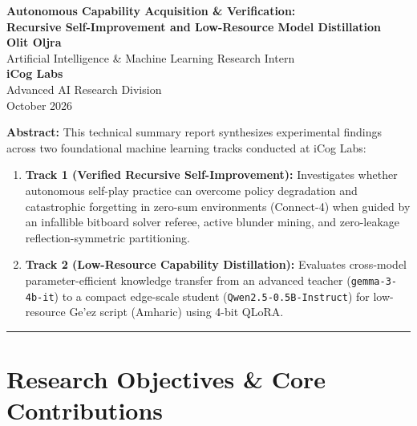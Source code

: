 \documentclass[11pt,a4paper]{article}
\begin{document}
\begin{titlepage}
\begin{center}
    \vspace*{1.5cm}
    {\LARGE\bfseries\color{headcol}
        Autonomous Capability Acquisition \& Verification:\\[6pt]
        Recursive Self-Improvement and Low-Resource Model Distillation
    }\\[1.5cm]
    {\Large\textbf{Olit Oljra}}\\[0.4cm]
    {\large Artificial Intelligence \& Machine Learning Research Intern}\\[0.6cm]
    {\large\textbf{iCog Labs}}\\[0.2cm]
    {\large Advanced AI Research Division}\\[1.2cm]
    {\large October 2026}
    \vfill
    \begin{minipage}{0.85\linewidth}
        \small
        \textbf{Abstract:} This technical summary report synthesizes experimental findings across two foundational machine learning tracks conducted at iCog Labs:
        \begin{enumerate}[leftmargin=1.5em, itemsep=2pt]
            \item \textbf{Track 1 (Verified Recursive Self-Improvement):} Investigates whether autonomous self-play practice can overcome policy degradation and catastrophic forgetting in zero-sum environments (Connect-4) when guided by an infallible bitboard solver referee, active blunder mining, and zero-leakage reflection-symmetric partitioning.
            \item \textbf{Track 2 (Low-Resource Capability Distillation):} Evaluates cross-model parameter-efficient knowledge transfer from an advanced teacher (\texttt{gemma-3-4b-it}) to a compact edge-scale student (\texttt{Qwen2.5-0.5B-Instruct}) for low-resource Ge'ez script (Amharic) using 4-bit QLoRA.
        \end{enumerate}
    \end{minipage}
    \vspace*{1.5cm}
    \rule{0.8\linewidth}{0.8pt}
\end{center}
\end{titlepage}

\section{Research Objectives \& Core Contributions}
\end{document}
